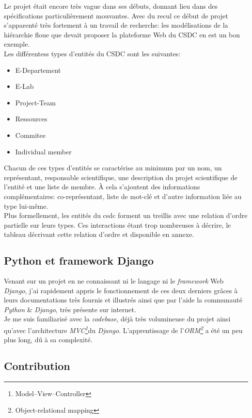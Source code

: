 \documentclass[french, 11pt]{memoir}
\begin{document}
\bigskip
Le projet était encore très vague dans ses débuts, donnant lieu dans des
spécifications particulièrement mouvantes. Avec du recul ce début de
projet s'apparenté très fortement à un travail de recherche: les
modélisations de la hiérarchie floue que devait proposer la plateforme
Web du CSDC en est un bon exemple. \\
Les différentess types d'entités du CSDC sont les suivantes:

\begin{itemize}
\item
  E-Departement
\item
  E-Lab
\item
  Project-Team
\item
  Ressources
\item
  Commitee
\item
  Individual member
\end{itemize}

\bigskip
Chacun de ces types d'entités se caractérise au minimum par un nom, un
représentant, responsable scientifique, une description du projet
scientifique de l'entité et une liste de membre. À cela s'ajoutent des
informations complémentaires: co-représentant, liste de mot-clé et
d'autre information liée au type lui-même. \\
Plus formellement, les entités du csdc forment un treillis avec une
relation d'ordre partielle sur leurs types. Ces interactions étant trop
nombreuses à décrire, le tableau décrivant cette relation d'ordre et
disponible en annexe.

\subsection{Python et framework
Django}\label{python-et-framework-django}

Venant sur un projet en ne connaissant ni le langage ni le
\emph{framework} Web \emph{Django}, j'ai rapidement appris le
fonctionnement de ces deux derniers grâces à leurs documentations très
fournis et illustrés ainsi que par l'aide la communauté \emph{Python} \&
\emph{Django}, très présente sur internet. \\
Je me suis familiarisé avec la \emph{codebase}, déjà très volumineuse du
projet ainsi qu'avec l'architecture \emph{MVC\footnote{Model–View–Controller}}du \emph{Django}.
L'apprentissage de l'\emph{ORM\footnote{Object-relational mapping}} a été un peu plus long, dû à sa
complexité.

\subsection{Contribution}\label{contribution-1}
\end{document}
